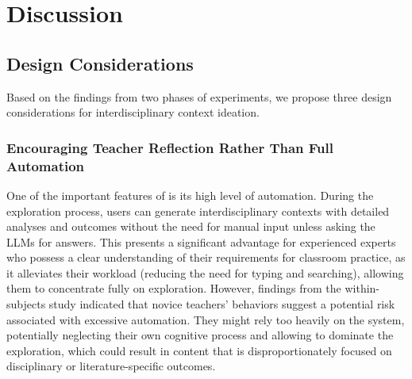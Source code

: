 \section{Discussion}\label{sec:discussion}
\subsection{Design Considerations }
Based on the findings from two phases of experiments, we propose three design considerations for interdisciplinary context ideation.

\subsubsection{Encouraging Teacher Reflection Rather Than Full Automation}
One of the important features of \name{} is its high level of automation. During the exploration process, users can generate interdisciplinary contexts with detailed analyses and outcomes without the need for manual input unless asking the LLMs for answers.
This presents a significant advantage for experienced experts who possess a clear understanding of their requirements for classroom practice, as it alleviates their workload (\eg reducing the need for typing and searching), allowing them to concentrate fully on exploration.
However, findings from the within-subjects study indicated that novice teachers' behaviors suggest a potential risk associated with excessive automation. They might rely too heavily on the system, potentially neglecting their own cognitive process and allowing \name{} to dominate the exploration, which could result in content that is disproportionately focused on disciplinary or literature-specific outcomes.

